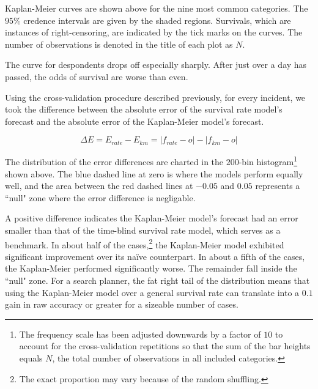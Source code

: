 \documentclass[12pt,titlepage]{article}
\begin{document}
    Kaplan-Meier curves are shown above for the nine most common categories.
    The $95\%$ credence intervals are given by the shaded regions. Survivals,
    which are instances of right-censoring, are indicated by the tick marks on
    the curves. The number of observations is denoted in the title of each plot
    as $N$.

    The curve for despondents drops off especially sharply. After just over
    a day has passed, the odds of survival are worse than even.


    

    Using the cross-validation procedure described previously, for every
    incident, we took the difference between the absolute error of the survival
    rate model's forecast and the absolute error of the Kaplan-Meier model's
    forecast.

    $$\Delta E = E_{rate} - E_{km} = |f_{rate} - o| - |f_{km} - o|$$

    The distribution of the error differences are charted in the $200$-bin
    histogram\footnote{The frequency scale has been adjusted downwards by a
    factor of $10$ to account for the cross-validation repetitions so that the
    sum of the bar heights equals $N$, the total number of observations in all
    included categories.} shown above. The blue dashed line at zero is where
    the models perform equally well, and the area between the red dashed lines
    at $-0.05$ and $0.05$ represents a ``null" zone where the error difference
    is negligable.

    A positive difference indicates the Kaplan-Meier model's forecast had an
    error smaller than that of the time-blind survival rate model, which serves
    as a benchmark. In about half of the cases,\footnote{The exact proportion
    may vary because of the random shuffling.} the Kaplan-Meier model
    exhibited significant improvement over its na{\"i}ve counterpart. In about
    a fifth of the cases, the Kaplan-Meier performed significantly worse. The
    remainder fall inside the ``null" zone. For a search planner, the fat right
    tail of the distribution means that using the Kaplan-Meier model over a
    general survival rate can translate into a $0.1$ gain in raw accuracy or
    greater for a sizeable number of cases.

    
\end{document}
